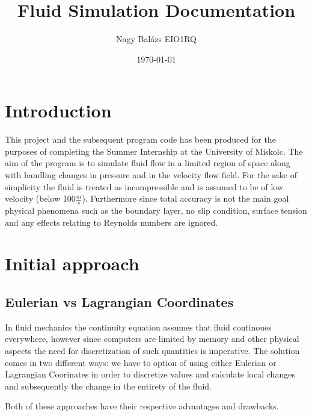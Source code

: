 \documentclass[12pt, titlepage]{article}
\begin{document}
\pagestyle{fancy}

\title{Fluid Simulation Documentation}
\author{Nagy Balázs EIO1RQ}
\date{\today}
\maketitle

\tableofcontents

\pagebreak

\section{Introduction}

This project and the subsequent program code has been produced for the purposes of completing the Summer Internship at the University of Miskolc. The aim of the program is to simulate fluid flow in a limited region of space along with handling changes in pressure and in the velocity flow field. For the sake of simplicity the fluid is treated as incompressible and is assumed to be of low velocity (below 100$\frac{m}{s}$). Furthermore since total accuracy is not the main goal physical phenomena such as the boundary layer, no slip condition, surface tension and any effects relating to Reynolds numbers are ignored.

\section{Initial approach}

\subsection{Eulerian vs Lagrangian Coordinates}
In fluid mechanics the continuity equation assumes that fluid continoues everywhere, however since computers are limited by memory and other physical aspects the need for discretization of such quantities is imperative. The solution comes in two different ways: we have to option of using either Eulerian or Lagrangian Coorinates in order to discretize values and calculate local changes and subsequently the change in the entirety of the fluid.

Both of these approaches have their respective advantages and drawbacks.
\end{document}
